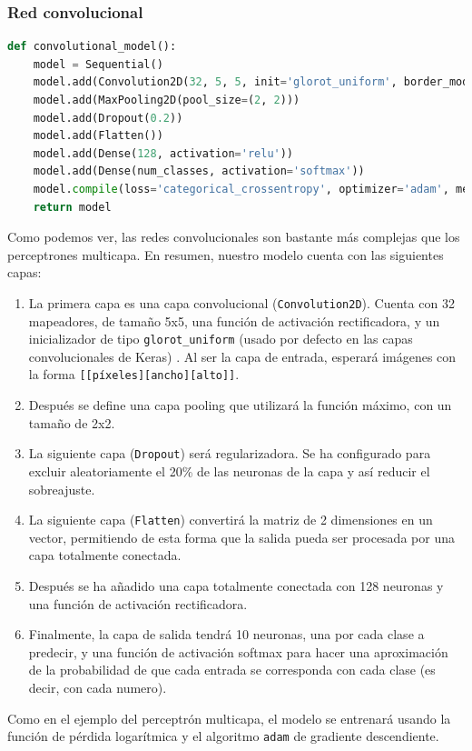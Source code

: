 \subsubsection{Red convolucional}
\begin{lstlisting}[language=Python]
def convolutional_model():
	model = Sequential()
	model.add(Convolution2D(32, 5, 5, init='glorot_uniform', border_mode='valid', input_shape=(1, 28, 28), activation='relu'))
	model.add(MaxPooling2D(pool_size=(2, 2)))
	model.add(Dropout(0.2))
	model.add(Flatten())
	model.add(Dense(128, activation='relu'))
	model.add(Dense(num_classes, activation='softmax'))
	model.compile(loss='categorical_crossentropy', optimizer='adam', metrics=['accuracy'])
	return model
\end{lstlisting}
Como podemos ver, las redes convolucionales son bastante más complejas que los perceptrones multicapa. En resumen, nuestro modelo cuenta con las siguientes capas:\\
\begin{enumerate}
\item La primera capa es una capa convolucional (\lstinline{Convolution2D}). Cuenta con 32 mapeadores, de tamaño 5x5, una función de activación rectificadora, y un inicializador de tipo \lstinline{glorot_uniform} (usado por defecto en las capas convolucionales de Keras) . Al ser la capa de entrada, esperará imágenes con la forma \lstinline{[[píxeles][ancho][alto]]}.
\item Después se define una capa pooling que utilizará la función máximo, con un tamaño de 2x2.
\item La siguiente capa (\lstinline{Dropout}) será regularizadora. Se ha configurado para excluir aleatoriamente el 20\% de las neuronas de la capa y así reducir el sobreajuste.
\item La siguiente capa (\lstinline{Flatten}) convertirá la matriz de 2 dimensiones en un vector, permitiendo de esta forma que la salida pueda ser procesada por una capa totalmente conectada.
\item Después se ha añadido una capa totalmente conectada con 128 neuronas y una función de activación rectificadora.
\item Finalmente, la capa de salida tendrá 10 neuronas, una por cada clase a predecir, y una función de activación softmax para hacer una aproximación de la probabilidad de que cada entrada se corresponda con cada clase (es decir, con cada numero).
\end{enumerate}
Como en el ejemplo del perceptrón multicapa, el modelo se entrenará usando la función de pérdida logarítmica y el algoritmo \lstinline{adam} de gradiente descendiente.
